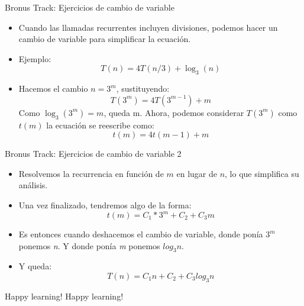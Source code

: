 \documentclass[aspectratio=169]{beamer}
\begin{document}
\begin{frame}{Bronus Track: Ejercicios de cambio de variable}
\begin{itemize}
    \item Cuando las llamadas recurrentes incluyen divisiones, podemos hacer un cambio de variable para simplificar la ecuación.
    \item Ejemplo: 
    \[
    T(n) = 4T(n/3) + \log_3(n)
    \]
    
    \item Hacemos el cambio \( n = 3^m \), sustituyendo:
    \[
    T(3^m) = 4T(3^{m-1}) + m
    \]
    Como \( \log_3(3^m) = m \), queda m. Ahora, podemos considerar \(T(3^m)\) como \(t(m)\) la ecuación se reescribe como:
    \[
    t(m) = 4t(m-1) + m
    \]
    
    
\end{itemize}
\end{frame}

\begin{frame}{Bronus Track: Ejercicios de cambio de variable 2}
\begin{itemize}
   \item Resolvemos la recurrencia en función de \( m \) en lugar de \( n \), lo que simplifica su análisis.
   \item Una vez finalizado, tendremos algo de la forma:
   \[t(m) = C_1*3^m + C_2 + C_3m\]
   \item  Es entonces cuando deshacemos el cambio de variable, donde ponía \(3^m\) ponemos \textit{n}. Y donde ponía \textit{m} ponemos \(log_3n\).
   \item Y queda: \[T(n) = C_1n + C_2 + C_3log_3n\]
\end{itemize}
\end{frame}

\begin{frame}{Happy learning!}
Happy learning!
\end{frame}
\end{document}
